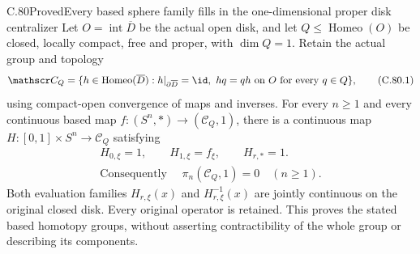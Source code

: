 \begin{claim}{C.80}{Proved}{Every based sphere family fills in the one-dimensional proper disk centralizer}
Let $O=\operatorname{int}\overline D$ be the actual
open disk, and let $Q\leq\operatorname{Homeo}(O)$
be closed, locally compact, free and proper, with
$\dim Q=1$. Retain the actual group and topology
\[
 \mathscr C_Q=
 \{h\in\operatorname{Homeo}(\overline D):
    h|_{\partial\overline D}=\id,
    \ hq=qh\text{ on }O\text{ for every }q\in Q\},
                                                               \tag{C.80.1}
\]
using compact-open convergence of maps and inverses.
For every $n\geq1$ and every continuous based map
$f:(S^n,*)\to(\mathscr C_Q,1)$, there is a continuous
map $H:[0,1]\times S^n\to\mathscr C_Q$ satisfying
\[
 \begin{gathered}
 H_{0,\xi}=1,\qquad H_{1,\xi}=f_\xi,\qquad H_{r,*}=1.\\
 \text{Consequently }\quad
 \pi_n(\mathscr C_Q,1)=0\quad(n\geq1).
 \end{gathered}
                                                               \tag{C.80.2}
\]
Both evaluation families $H_{r,\xi}(x)$ and
$H_{r,\xi}^{-1}(x)$ are jointly continuous on the
original closed disk. Every original operator is
retained. This proves the stated based homotopy
groups, without asserting contractibility of the
whole group or describing its components.
\end{claim}

